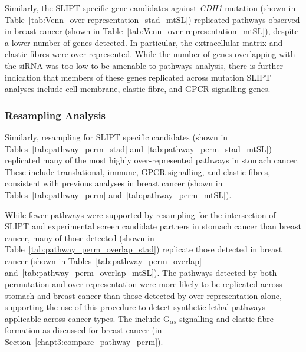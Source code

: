 Similarly, the \gls{SLIPT}-specific gene candidates against \textit{CDH1} \gls{mutation} (shown in Table~\ref{tab:Venn_over-representation_stad_mtSL}) replicated \glspl{pathway} observed in breast cancer (shown in Table~\ref{tab:Venn_over-representation_mtSL}), despite a lower number of genes detected. In particular, the extracellular matrix and elastic fibres were over-represented. While the number of genes overlapping with the \gls{siRNA} was too low to be amenable to \glspl{pathway} analysis, there is further indication that members of these genes replicated across \gls{mutation} \gls{SLIPT} analyses include cell-membrane, elastic fibre, and \gls{GPCR} signalling genes. 

\FloatBarrier

\subsubsection{Resampling Analysis}  \label{chapt3:compare_pathway_perm_stad_SL}

Similarly, resampling for \gls{SLIPT} specific candidates (shown in Tables~\ref{tab:pathway_perm_stad} and~\ref{tab:pathway_perm_stad_mtSL}) replicated many of the most highly over-represented \glspl{pathway} in stomach cancer. These include translational, immune, \gls{GPCR} signalling, and elastic fibres, consistent with previous analyses in breast cancer (shown in Tables~\ref{tab:pathway_perm} and~\ref{tab:pathway_perm_mtSL}).

While fewer \glspl{pathway} were supported by resampling for the intersection of \gls{SLIPT} and experimental screen \citep{Telford2015} candidate partners in stomach cancer than breast cancer, many of those detected (shown in Table~\ref{tab:pathway_perm_overlap_stad}) replicate those detected in breast cancer (shown in Tables~\ref{tab:pathway_perm_overlap} and~\ref{tab:pathway_perm_overlap_mtSL}). The \glspl{pathway} detected by both permutation and over-representation were more likely to be replicated across stomach and breast cancer than those detected by over-representation alone, supporting the use of this procedure to detect \gls{synthetic lethal} \glspl{pathway} applicable across cancer types. The include G$_{\alpha s}$ signalling and elastic fibre formation as discussed for breast cancer (in Section~\ref{chapt3:compare_pathway_perm}).

